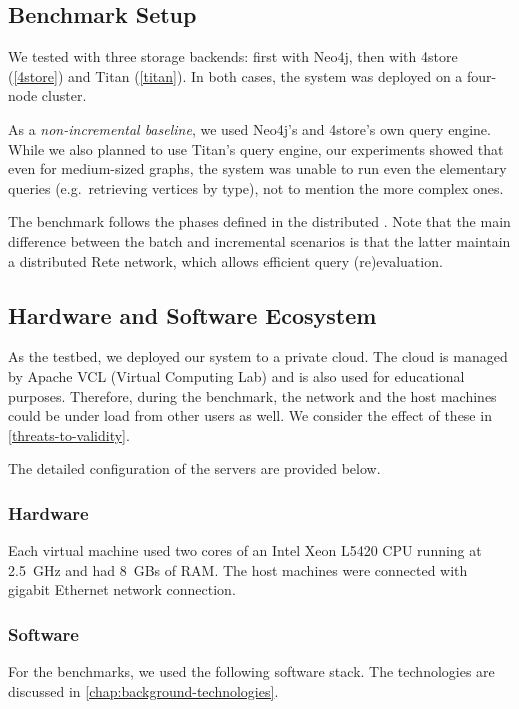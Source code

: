\subsection{Benchmark Setup}

We tested \iqd{} with three storage backends: first with Neo4j, then with 4store (\autoref{4store}) and Titan (\autoref{titan}). In both cases, the system was deployed on a four-node cluster.

As a \emph{non-incremental baseline}, we used Neo4j's and 4store's own query engine. While we also planned to use Titan's query engine, our experiments showed that even for medium-sized graphs, the system was unable to run even the elementary queries (e.g.\ retrieving vertices by type), not to mention the more complex ones.

The benchmark follows the phases defined in the distributed \tb{}. Note that the main difference between the batch and incremental scenarios is that the latter maintain a distributed Rete network, which allows efficient query (re)evaluation.

\subsection{Hardware and Software Ecosystem}
\label{ecosystem}

As the testbed, we deployed our system to a private cloud. The cloud is managed by Apache VCL (Virtual Computing Lab) and is also used for educational purposes. Therefore, during the benchmark, the network and the host machines could be under load from other users as well. We consider the effect of these in \autoref{threats-to-validity}.

The detailed configuration of the servers are provided below.

\subsubsection{Hardware}
 
Each virtual machine used two cores of an Intel Xeon L5420 CPU running at 2.5~GHz and had 8~GBs of RAM. The host machines were connected with gigabit Ethernet network connection.

\subsubsection{Software}

For the benchmarks, we used the following software stack. The technologies are discussed in \autoref{chap:background-technologies}.

